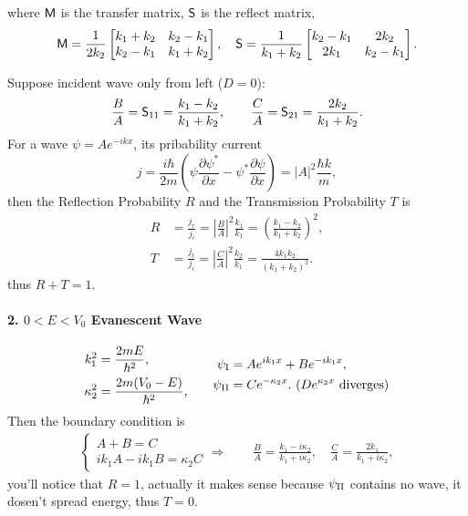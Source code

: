 \documentclass{article}
\newcommand{\pd}[2]{\frac{\partial #1}{\partial #2}}%
\newcommand{\kh}[1]{\left(#1\right)}
\begin{document}
where $\sM$ is the transfer matrix, $\sS$ is the reflect matrix,
\begin{align*}
	\mathsf M=\frac1{2k_2}\begin{bmatrix}k_1+k_2&k_2-k_1\\k_2-k_1&k_1+k_2\end{bmatrix},\quad
	\mathsf S=\frac1{k_1+k_2}\begin{bmatrix}k_2-k_1&2k_2\\2k_1&k_2-k_1\end{bmatrix}.
\end{align*}
\iffalse
	transfromation between $\sS$ and $\sM$
	\begin{align*}
		\sS=\frac1{\sM_{22}}\begin{bmatrix}-\sM_{22}&1\\|\sM|&\sM_{12}\end{bmatrix},\qquad
		\sM=\frac1{\sS_{12}}\begin{bmatrix}-|\sS|&\sS_{22}\\-\sS_{11}&1\end{bmatrix}.
	\end{align*}
\fi
Suppose incident wave only from left ($D=0$):
$$\frac BA=\mathsf S_{11}=\frac{k_1-k_2}{k_1+k_2},\qquad\frac CA=\mathsf S_{21}=\frac{2k_2}{k_1+k_2}.$$
For a wave $\psi=Ae^{-ikx}$, its pribability current
$$j=\frac{i\hbar}{2m}\kh{\psi\pd{\psi^*}x-\psi^*\pd{\psi}x}=|A|^2\frac{\hbar k}m,$$
then the Reflection Probability $R$ and the Transmission Probability $T$ is
\begin{align*}
	R & =\frac{j_r}{j_i}=\left|\frac BA\right|^2\frac{k_1}{k_1}=\left(\frac{k_1-k_2}{k_1+k_2}\right)^2, \\
	T & =\frac{j_t}{j_i}=\left|\frac CA\right|^2\frac{k_2}{k_1}=\frac{4k_1k_2}{(k_1+k_2)^2}.
\end{align*}
thus $R+T=1$.
\paragraph{2. $0<E<V_0$ Evanescent Wave}
\begin{align*}
	\begin{aligned}
		k_1^2      & =\frac{2mE}{\hbar^2},       \\
		\kappa_2^2 & =\frac{2m(V_0-E)}{\hbar^2},
	\end{aligned}\qquad
	\begin{aligned}
		\psi_{\rm I}  & =Ae^{ik_1x}+Be^{-ik_1x},                          \\
		\psi_{\rm II} & =Ce^{-\kappa_2x}.~(De^{\kappa_2x}~{\rm diverges})
	\end{aligned}
\end{align*}
Then the boundary condition is
\begin{gather*}
	\left\{
	\begin{matrix}
		A+B=C \\ik_1A-ik_1B=\kappa_2C
	\end{matrix}\right.
	\Rightarrow\qquad
	\frac BA=\frac{k_1-i\kappa_2}{k_1+i\kappa_2},\quad
	\frac CA=\frac{2k_1}{k_1+i\kappa_2},
\end{gather*}
you'll notice that $R=1$, actually it makes sense because $\psi_{\rm II}$ contains no wave, it dosen't spread energy, thus $T=0$.
\end{document}

